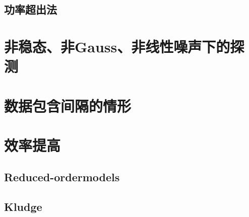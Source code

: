 \subsection{功率超出法}

\section{非稳态、非Gauss、非线性噪声下的探测}

\section{数据包含间隔的情形}

\section{效率提高}
\subsection{Reduced-ordermodels}
\subsection{Kludge}
